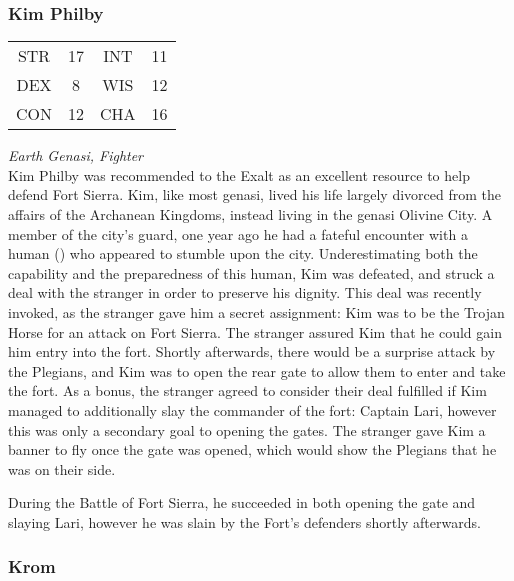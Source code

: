 \subsubsection{Kim Philby}
\label{people:philby}
\begin{center}
\begin{tabular}{c c|c c}
STR & 17 & INT & 11\\
DEX & 8 & WIS & 12 \\
CON & 12 & CHA & 16 \end{tabular}\end{center}
\textit{Earth Genasi, Fighter}\\
Kim Philby was recommended to the Exalt as an excellent resource to help defend Fort Sierra. Kim, like most genasi, lived his life largely divorced from the affairs of the Archanean Kingdoms, instead living in the genasi Olivine City. A member of the city's guard, one year ago he had a fateful encounter with a human () who appeared to stumble upon the city. Underestimating both the capability and the preparedness of this human, Kim was defeated, and struck a deal with the stranger in order to preserve his dignity. This deal was recently invoked, as the stranger gave him a secret assignment: Kim was to be the Trojan Horse for an attack on Fort Sierra. The stranger assured Kim that he could gain him entry into the fort. Shortly afterwards, there would be a surprise attack by the Plegians, and Kim was to open the rear gate to allow them to enter and take the fort. As a bonus, the stranger agreed to consider their deal fulfilled if Kim managed to additionally slay the commander of the fort: Captain Lari, however this was only a secondary goal to opening the gates. The stranger gave Kim a banner to fly once the gate was opened, which would show the Plegians that he was on their side. 

During the Battle of Fort Sierra, he succeeded in both opening the gate and slaying Lari, however he was slain by the Fort's defenders shortly afterwards. 

\subsubsection{Krom}
\label{people:chrom}



